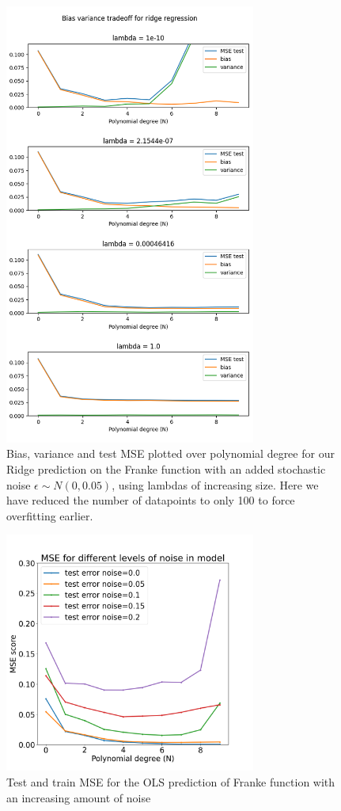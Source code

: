 \documentclass[twocolumn,10pt,cleanfoot]{asme2ej}
\begin{document}
\begin{figure} 
\centerline{\includegraphics[width=3.25in]{figure/frankiedifflambdas.png}}
\caption{Bias, variance and test MSE plotted over polynomial degree for our Ridge prediction on the Franke function with an added stochastic noise $\epsilon \sim N(0,0.05)$, using lambdas of increasing size. Here we have reduced the number of datapoints to only 100 to force overfitting earlier.}
\label{frankiedifflambdas}
\end{figure}

\begin{figure}
\centerline{\includegraphics[width=3.25in]{figure/frankienoisecomparison.png}}
\caption{Test and train MSE for the OLS prediction of Franke function with an increasing amount of noise}
\label{frankienoisecomparison}
\end{figure}
\end{document}
